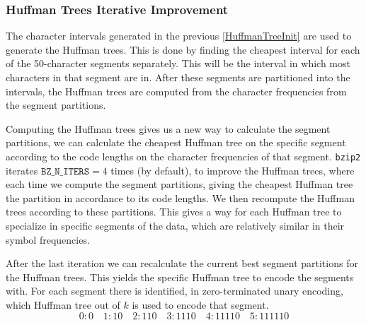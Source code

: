 \documentclass{article}
\begin{document}
\subsubsection{Huffman Trees Iterative Improvement}\label{HuffmanIterativeImprovementSection}
The character intervals generated in the previous \cref{HuffmanTreeInit} are used to generate the Huffman trees. This is done by finding the cheapest interval for each of the 50-character segments separately. This will be the interval in which most characters in that segment are in. After these segments are partitioned into the intervals, the Huffman trees are computed from the character frequencies from the segment partitions.

Computing the Huffman trees gives us a new way to calculate the segment partitions, we can calculate the cheapest Huffman tree on the specific segment according to the code lengths on the character frequencies of that segment. \texttt{bzip2} iterates \(\texttt{BZ\_N\_ITERS} = 4\) times (by default), to improve the Huffman trees, where each time we compute the segment partitions, giving the cheapest Huffman tree the partition in accordance to its code lengths. We then recompute the Huffman trees according to these partitions. This gives a way for each Huffman tree to specialize in specific segments of the data, which are relatively similar in their symbol frequencies.

After the last iteration we can recalculate the current best segment partitions for the Huffman trees. This yields the specific Huffman tree to encode the segments with. For each segment there is identified, in zero-terminated unary encoding, which Huffman tree out of \(k\) is used to encode that segment.
\[
    0: 0 \quad 1: 10 \quad 2: 110 \quad 3: 1110 \quad 4: 11110 \quad 5: 111110
\]
\end{document}
